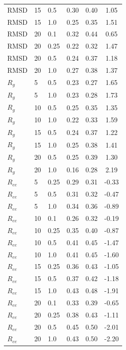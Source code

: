 \begin{longtable}{lllccc}
RMSD & 15 & 0.5 & 0.30 & 0.40 & 1.05 \\
RMSD & 15 & 1.0 & 0.25 & 0.35 & 1.51 \\
RMSD & 20 & 0.1 & 0.32 & 0.44 & 0.65 \\
RMSD & 20 & 0.25 & 0.22 & 0.32 & 1.47 \\
RMSD & 20 & 0.5 & 0.24 & 0.37 & 1.18 \\
RMSD & 20 & 1.0 & 0.27 & 0.38 & 1.37 \\
$R_g$ & 5 & 0.5 & 0.23 & 0.27 & 1.65 \\
$R_g$ & 5 & 1.0 & 0.23 & 0.28 & 1.73 \\
$R_g$ & 10 & 0.5 & 0.25 & 0.35 & 1.35 \\
$R_g$ & 10 & 1.0 & 0.22 & 0.33 & 1.59 \\
$R_g$ & 15 & 0.5 & 0.24 & 0.37 & 1.22 \\
$R_g$ & 15 & 1.0 & 0.25 & 0.38 & 1.41 \\
$R_g$ & 20 & 0.5 & 0.25 & 0.39 & 1.30 \\
$R_g$ & 20 & 1.0 & 0.16 & 0.28 & 2.19 \\
$R_{ee}$ & 5 & 0.25 & 0.29 & 0.31 & -0.33 \\
$R_{ee}$ & 5 & 0.5 & 0.31 & 0.32 & -0.47 \\
$R_{ee}$ & 5 & 1.0 & 0.34 & 0.36 & -0.89 \\
$R_{ee}$ & 10 & 0.1 & 0.26 & 0.32 & -0.19 \\
$R_{ee}$ & 10 & 0.25 & 0.35 & 0.40 & -0.87 \\
$R_{ee}$ & 10 & 0.5 & 0.41 & 0.45 & -1.47 \\
$R_{ee}$ & 10 & 1.0 & 0.41 & 0.45 & -1.60 \\
$R_{ee}$ & 15 & 0.25 & 0.36 & 0.43 & -1.05 \\
$R_{ee}$ & 15 & 0.5 & 0.37 & 0.42 & -1.18 \\
$R_{ee}$ & 15 & 1.0 & 0.43 & 0.48 & -1.91 \\
$R_{ee}$ & 20 & 0.1 & 0.33 & 0.39 & -0.65 \\
$R_{ee}$ & 20 & 0.25 & 0.38 & 0.43 & -1.11 \\
$R_{ee}$ & 20 & 0.5 & 0.45 & 0.50 & -2.01 \\
$R_{ee}$ & 20 & 1.0 & 0.43 & 0.50 & -2.20\\ \bottomrule
\end{longtable}

